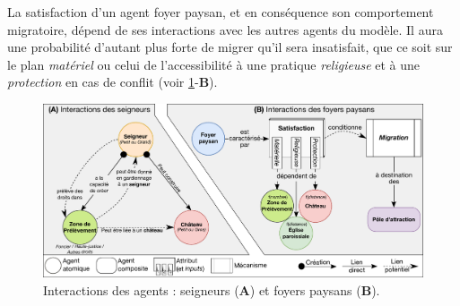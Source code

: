 La satisfaction d'un agent foyer paysan, et en conséquence son comportement migratoire, dépend de ses interactions avec les autres agents du modèle.
Il aura une probabilité d'autant plus forte de migrer qu'il sera insatisfait, que ce soit sur le plan \textit{matériel} ou celui de l'accessibilité à une pratique \textit{religieuse} et à une \textit{protection} en cas de conflit (voir \cref{fig:interactions-agents}-\textbf{B}).

\begin{figure}[H]
	\centering
	\includegraphics[width=\linewidth]{img/agents_interactions.pdf}
	\caption{Interactions des agents : seigneurs (\textbf{A}) et foyers paysans (\textbf{B}).}
	\label{fig:interactions-agents}
\end{figure}

\medskip

